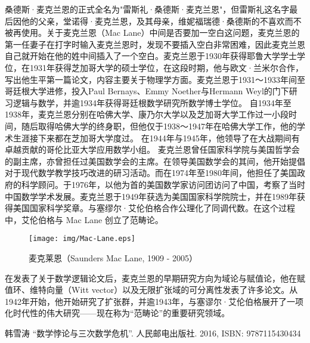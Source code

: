 \documentclass{article}
\begin{document}
桑德斯·麦克兰恩的正式全名为"雷斯礼·桑德斯·麦克兰恩"，但雷斯礼这名字最后因他的父亲，堂诺得·麦克兰恩，及其母亲，维妮福瑞德·桑德斯的不喜欢而不被再使用。关于麦克兰恩（Mac Lane）中间是否要加一空白这问题，麦克兰恩的第一任妻子在打字时输入麦克兰恩时，发现不要插入空白非常困难，因此麦克兰恩自己就开始在他的姓中间插入了一个空白。麦克兰恩于1930年获得耶鲁大学学士学位，在1931年获得芝加哥大学的硕士学位，在这段时期，他与欧文·兰米尔合作，写出他生平第一篇论文，内容主要关于物理学方面。麦克兰恩于1931～1933年间至哥廷根大学进修，投入Paul Bernays、Emmy Noether与Hermann Weyl的门下研习逻辑与数学，并逾1934年获得哥廷根数学研究所数学博士学位。
自1934年至1938年，麦克兰恩分别在哈佛大学、康乃尔大学以及芝加哥大学工作过一小段时间，随后取得哈佛大学的终身职，但他仅于1938～1947年在哈佛大学工作，他的学术生涯接下来都在芝加哥大学度过。
在1944年与1945年，他领导了在大战期间有卓越贡献的哥伦比亚大学应用数学小组。
麦克兰恩曾任国家科学院与美国哲学会的副主席，亦曾担任过美国数学会的主席。在领导美国数学会的其间，他开始提倡对于现代数学教学技巧改进的研习活动。而在1974年至1980年间，他担任了美国政府的科学顾问。于1976年，以他为首的美国数学家访问团访问了中国，考察了当时中国数学学术发展。麦克兰恩于1949年获选为美国国家科学院院士，并在1989年获得美国国家科学奖章。与塞缪尔·艾伦伯格合作公理化了同调代数。在这个过程中，艾伦伯格与 Mac Lane 创立了范畴论。

\begin{wrapfigure}{R}{0.3\textwidth}
 \centering
 \texttt{[image: img/Mac-Lane.eps]}
 \captionsetup{labelformat=empty}
 \caption{麦克莱恩（Saunders Mac Lane, 1909 - 2005）}
 \label{fig:Pythagoras}
\end{wrapfigure}

在发表了关于数学逻辑论文后，麦克兰恩的早期研究方向为域论与赋值论，他在赋值环、维特向量（Witt vector）以及无限扩张域的可分离性发表了许多论文。从1942年开始，他开始研究了扩张群，并逾1943年，与塞谬尔·艾伦伯格展开了一项化时代性的伟大研究——现在称为“范畴论”的重要研究领域。

\ifx\wholebook\relax \else
\begin{thebibliography}{99}

韩雪涛 ``数学悖论与三次数学危机''. 人民邮电出版社. 2016, ISBN: 9787115430434

\end{thebibliography}

\expandafter\enddocument

\fi
\end{document}
